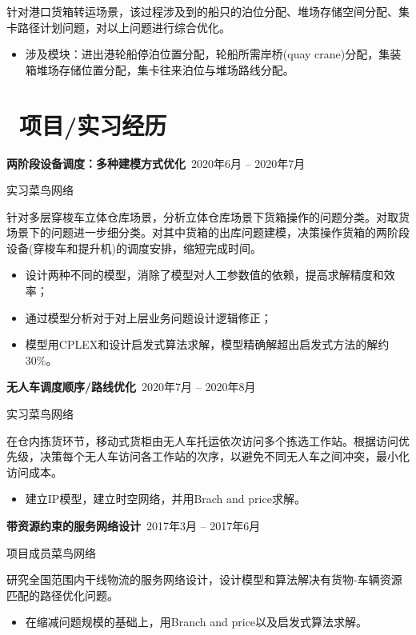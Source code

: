 \documentclass[11pt]{article}
\begin{document}
针对港口货箱转运场景，该过程涉及到的船只的泊位分配、堆场存储空间分配、集卡路径计划问题，对以上问题进行综合优化。

\begin{itemize}
  \item 涉及模块：进出港轮船停泊位置分配，轮船所需岸桥(quay crane)分配，集装箱堆场存储位置分配，集卡往来泊位与堆场路线分配。
\end{itemize}

\section{\makebox[\widthof{\faGraduationCap}][c]{\color{CVBlue}\faUsers}\ 项目/实习经历}

\textbf{两阶段设备调度：多种建模方式优化}\  \hfill 2020年6月 -- 2020年7月

实习\quad 菜鸟网络

针对多层穿梭车立体仓库场景，分析立体仓库场景下货箱操作的问题分类。对取货场景下的问题进一步细分类。对其中货箱的出库问题建模，决策操作货箱的两阶段设备(穿梭车和提升机)的调度安排，缩短完成时间。

\begin{itemize}
  \item 设计两种不同的模型，消除了模型对人工参数值的依赖，提高求解精度和效率；
  \item 通过模型分析对于对上层业务问题设计逻辑修正；
  \item 模型用CPLEX和设计启发式算法求解，模型精确解超出启发式方法的解约30\%。
\end{itemize}

\textbf{无人车调度顺序/路线优化}\  \hfill 2020年7月 -- 2020年8月

实习\quad 菜鸟网络

在仓内拣货环节，移动式货柜由无人车托运依次访问多个拣选工作站。根据访问优先级，决策每个无人车访问各工作站的次序，以避免不同无人车之间冲突，最小化访问成本。

\begin{itemize}
  \item 建立IP模型，建立时空网络，并用Brach and price求解。
\end{itemize}

\textbf{带资源约束的服务网络设计}\  \hfill 2017年3月 -- 2017年6月

项目成员\quad 菜鸟网络

研究全国范围内干线物流的服务网络设计，设计模型和算法解决有货物-车辆资源匹配的路径优化问题。

\begin{itemize}
  \item 在缩减问题规模的基础上，用Branch and price以及启发式算法求解。
\end{itemize}
\end{document}
